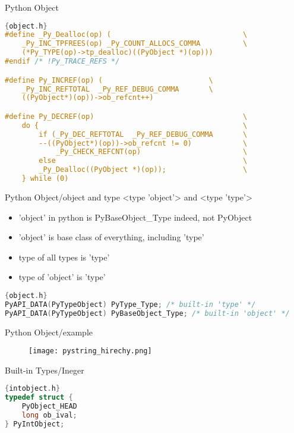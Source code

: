 \documentclass[xcolor=svgnames]{beamer}
\begin{document}
\begin{frame}[fragile]{Python Object}
    \begin{lstlisting}[language=C]{object.h}
#define _Py_Dealloc(op) (                               \
    _Py_INC_TPFREES(op) _Py_COUNT_ALLOCS_COMMA          \
    (*Py_TYPE(op)->tp_dealloc)((PyObject *)(op)))
#endif /* !Py_TRACE_REFS */

#define Py_INCREF(op) (                         \
    _Py_INC_REFTOTAL  _Py_REF_DEBUG_COMMA       \
    ((PyObject*)(op))->ob_refcnt++)

#define Py_DECREF(op)                                   \
    do {                                                \
        if (_Py_DEC_REFTOTAL  _Py_REF_DEBUG_COMMA       \
        --((PyObject*)(op))->ob_refcnt != 0)            \
            _Py_CHECK_REFCNT(op)                        \
        else                                            \
        _Py_Dealloc((PyObject *)(op));                  \
    } while (0)
\end{lstlisting} 
\end{frame}


\begin{frame}[fragile]{Python Object/object and type}
    <type 'object'> and <type 'type'>
    \begin{itemize}
        \item 'object' in python is PyBaseObject\_Type indeed, not PyObject
        \item 'object' is base class of everything, including 'type'
        \item type of all types is 'type'
        \item type of 'object' is 'type'
    \end{itemize}
    \begin{lstlisting}[language=C]{object.h}
PyAPI_DATA(PyTypeObject) PyType_Type; /* built-in 'type' */
PyAPI_DATA(PyTypeObject) PyBaseObject_Type; /* built-in 'object' */
    \end{lstlisting} 
\end{frame}

\begin{frame}[fragile]{Python Object/example}
    \begin{figure}
       \begin{center}
       \texttt{[image: pystring\_hirechy.png]}
       \end{center}
\end{figure}
\end{frame}
\begin{frame}[fragile]{Built-in Types/Ineger}
\begin{lstlisting}[language=C]{intobject.h}
typedef struct {
    PyObject_HEAD
    long ob_ival;
} PyIntObject;
\end{lstlisting} 
\end{frame}
\end{document}
